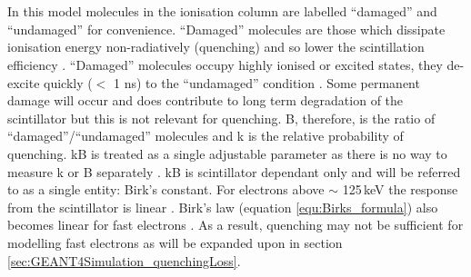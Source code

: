 \\\\In this model molecules in the ionisation column are labelled ``damaged'' and ``undamaged'' for convenience. ``Damaged'' molecules are those which dissipate ionisation energy non-radiatively (quenching) and so lower the scintillation efficiency\cite{craun_1970} \cite{knoll_2010}. ``Damaged'' molecules occupy highly ionised or excited states, they de-excite quickly ($<$ 1 ns) to the ``undamaged'' condition \cite{craun_1970}. Some permanent damage will occur and does contribute to long term degradation of the scintillator but this is not relevant for quenching\cite{craun_1970}. B, therefore, is the ratio of ``damaged''/``undamaged'' molecules and k is the relative probability of quenching. kB is treated as a single adjustable parameter as there is no way to measure k or B separately \cite{craun_1970} \cite{knoll_2010}. kB is scintillator dependant only and will be referred to as a single entity: Birk's constant. For electrons above $\sim$ 125\,keV the response from the scintillator is linear \cite{craun_1970}. Birk's law (equation \ref{equ:Birks_formula}) also becomes linear for fast electrons \cite{knoll_2010}. As a result, quenching may not be sufficient for modelling fast electrons as will be expanded upon in section \ref{sec:GEANT4Simulation_quenchingLoss}. 
